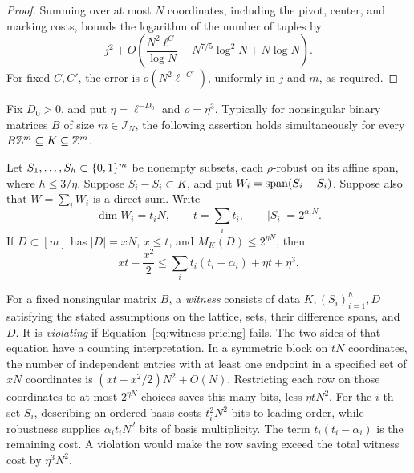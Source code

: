 \begin{proof}
Summing over at most \(N\) coordinates, including the pivot, center,
and marking costs, bounds the logarithm of the number of tuples by
\[
 j^2+O\!\left(
   \frac{N^2\ell^C}{\log N}+N^{7/5}\log^2N+N\log N
 \right).
\]
For fixed \(C,C'\), the error is \(o(N^2\ell^{-C'})\), uniformly in
\(j\) and \(m\), as required.
\end{proof}

\begin{proposition}\label{prop:witness-pricing}
Fix \(D_0>0\), and put \(\eta=\ell^{-D_0}\) and \(\rho=\eta^3\).
Typically for nonsingular binary matrices \(B\) of size
\(m\in\mathcal I_N\), the following assertion holds simultaneously
for every \(B\mathbb Z^m\subseteq K\subseteq\mathbb Z^m\).

Let \(S_1,\ldots,S_h\subset\{0,1\}^m\) be nonempty subsets, each
\(\rho\)-robust on its affine span, where \(h\le3/\eta\). Suppose
\(S_i-S_i\subset K\), and put \(W_i=\operatorname{span}(S_i-S_i)\). Suppose also
that \(W=\sum_i W_i\) is a direct sum. Write
\[
 \dim W_i=t_iN,\qquad t=\sum_i t_i,\qquad |S_i|=2^{\alpha_iN}.
\]
If \(D\subset[m]\) has \(|D|=xN\), \(x\le t\), and
\(M_K(D)\le2^{\eta N}\), then
\begin{equation}\label{eq:witness-pricing}
 xt-\frac{x^2}{2}
 \le \sum_i t_i(t_i-\alpha_i)+\eta t+\eta^3.
\end{equation}
\end{proposition}

For a fixed nonsingular matrix \(B\), a \emph{witness} consists of data
\(K,(S_i)_{i=1}^h,D\) satisfying the stated assumptions on the lattice,
sets, their difference spans, and \(D\). It is \emph{violating} if
Equation~\eqref{eq:witness-pricing} fails.
The two sides of that equation have a counting interpretation. In a
symmetric block on \(tN\) coordinates, the number
of independent entries with at least one endpoint in a specified set
of \(xN\) coordinates is
\((xt-x^2/2)N^2+O(N)\). Restricting each row on those coordinates to
at most \(2^{\eta N}\) choices saves this many bits, less
\(\eta tN^2\). For the \(i\)-th set \(S_i\), describing an ordered basis
costs \(t_i^2N^2\) bits to leading order, while robustness supplies
\(\alpha_i t_iN^2\) bits of basis multiplicity. The term
\(t_i(t_i-\alpha_i)\) is the remaining cost. A violation would make
the row saving exceed the total witness cost by \(\eta^3N^2\).

